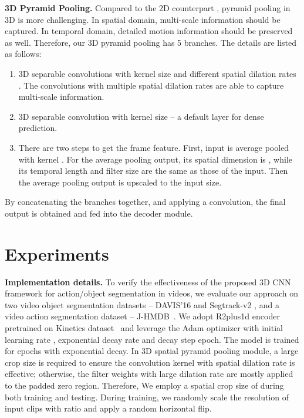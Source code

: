 \documentclass{bmvc2k}
\begin{document}
\textbf{3D Pyramid Pooling.}
Compared to the 2D counterpart \cite{chen2018deeplab}, pyramid pooling in 3D is more challenging. In spatial domain, multi-scale information should be captured. In temporal domain, detailed motion information should be preserved as well.
Therefore, our 3D pyramid pooling has 5 branches. The details are listed as follows:
\begin{enumerate}\item 3D separable convolutions with kernel size  and different spatial dilation rates . The convolutions with multiple spatial dilation rates are able to capture multi-scale information. 

\item 3D separable convolution with kernel size  -- a default layer for dense prediction.

\item There are two steps to get the frame feature. First, input is average pooled with kernel . For the average pooling output, its spatial dimension is , while its temporal length and filter size are the same as those of the input. Then the average pooling output is upscaled to the input size.
\end{enumerate}

By concatenating the  branches together, and applying a  convolution, the final output is obtained and fed into the decoder module.


\section{Experiments}
\label{sec:experiments}
\textbf{Implementation details.} 
To verify the effectiveness of the proposed 3D CNN framework for action/object segmentation in videos, we evaluate our approach on two video object segmentation datasets -- DAVIS'16 \cite{Perazzi2016} and Segtrack-v2 \cite{li2013video}, and a video action segmentation dataset -- J-HMDB~\cite{Jhuang:ICCV:2013}. We adopt R2plus1d encoder pretrained on Kinetics dataset~\cite{zisserman2017kinetics} and leverage the Adam optimizer with initial learning rate , exponential decay rate  and decay step  epoch. The model is trained for  epochs with exponential decay.
In 3D spatial pyramid pooling module, a large crop size is required to ensure the convolution kernel with spatial dilation rate is effective; otherwise, the filter weights with large dilation rate are mostly applied to the padded zero region. Therefore, We employ a spatial crop size of  during both training and testing.
During training, we randomly scale the resolution of input clips with ratio  and apply a random horizontal flip.
\end{document}
